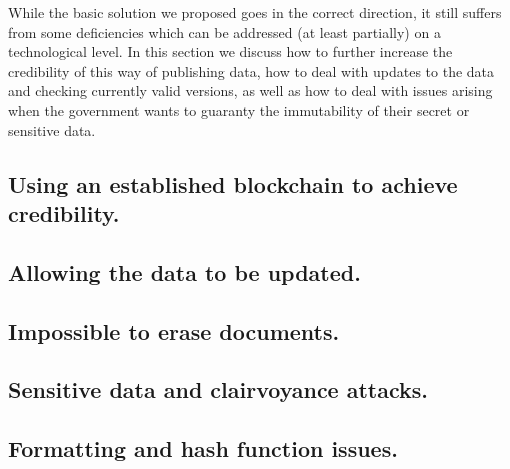 

While the basic solution we proposed goes in the correct direction, it still suffers from some deficiencies which can be addressed (at least partially) on a technological level. In this section we discuss how to further increase the credibility of this way of publishing data, how to deal with updates to the data and checking currently valid versions, as well as how to deal with issues arising when the government wants to guaranty the immutability of their secret or sensitive data. 

\subsection{Using an established blockchain to achieve credibility.}



\subsection{Allowing the data to be updated.}



\subsection{Impossible to erase documents.}



\subsection{Sensitive data and clairvoyance attacks.}



\subsection{Formatting and hash function issues.}



